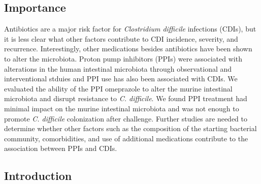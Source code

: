 \documentclass[11pt,]{article}
\begin{document}
\subsection{Importance}\label{importance}

Antibiotics are a major risk factor for \emph{Clostridium difficile}
infections (CDIs), but it is less clear what other factors contribute to
CDI incidence, severity, and recurrence. Interestingly, other
medications besides antibiotics have been shown to alter the microbiota.
Proton pump inhibitors (PPIs) were associated with alterations in the
human intestinal microbiota through observational and interventional
stduies and PPI use has also been associated with CDIs. We evaluated the
ability of the PPI omeprazole to alter the murine intestinal microbiota
and disrupt resistance to \emph{C. difficile}. We found PPI treatment
had minimal impact on the murine intestinal microbiota and was not
enough to promote \emph{C. difficile} colonization after challenge.
Further studies are needed to determine whether other factors such as
the composition of the starting bacterial community, comorbidities, and
use of additional medications contribute to the association between PPIs
and CDIs.

\newpage

\subsection{Introduction}\label{introduction}
\end{document}
